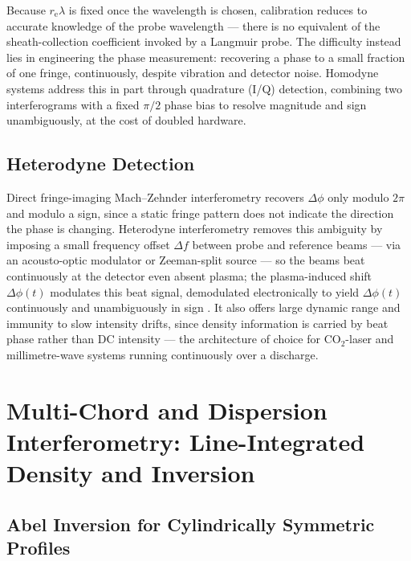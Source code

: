 Because $r_{\mathrm{e}}\lambda$ is fixed once the wavelength is chosen, calibration reduces to accurate knowledge of the probe wavelength — there is no equivalent of the sheath-collection coefficient invoked by a Langmuir probe. The difficulty instead lies in engineering the phase measurement: recovering a phase to a small fraction of one fringe, continuously, despite vibration and detector noise. Homodyne systems address this in part through quadrature (I/Q) detection, combining two interferograms with a fixed $\pi/2$ phase bias to resolve magnitude and sign unambiguously, at the cost of doubled hardware.

\subsection{Heterodyne Detection}

Direct fringe-imaging Mach--Zehnder interferometry recovers $\Delta\phi$ only modulo $2\pi$ and modulo a sign, since a static fringe pattern does not indicate the direction the phase is changing. Heterodyne interferometry removes this ambiguity by imposing a small frequency offset $\Delta f$ between probe and reference beams — via an acousto-optic modulator or Zeeman-split source — so the beams beat continuously at the detector even absent plasma; the plasma-induced shift $\Delta\phi(t)$ modulates this beat signal, demodulated electronically to yield $\Delta\phi(t)$ continuously and unambiguously in sign \cite{ref0400}. It also offers large dynamic range and immunity to slow intensity drifts, since density information is carried by beat phase rather than DC intensity — the architecture of choice for CO$_{2}$-laser and millimetre-wave systems running continuously over a discharge.

\section{Multi-Chord and Dispersion Interferometry: Line-Integrated Density and Inversion}
\label{sec:interf-multichord}

\subsection{Abel Inversion for Cylindrically Symmetric Profiles}


